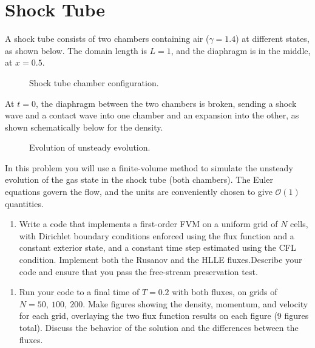 \pagebreak
\section{Shock Tube}
A shock tube consists of two chambers containing air ($\gamma = 1.4$) at different states, as shown below. The domain length is $L= 1$, and the diaphragm is in the middle, at $x= 0.5$.

\begin{figure}[h]
    \centering
    
    \caption{Shock tube chamber configuration.}
\end{figure}

At $t= 0$, the diaphragm between the two chambers is broken, sending a shock wave and a contact wave into one chamber and an expansion into the other, as shown schematically below for the density.

\begin{figure}[h]
    \centering
    
    \caption{Evolution of unsteady evolution.}
\end{figure}

In this problem you will use a finite-volume method to simulate the unsteady evolution of the gas state in the shock tube (both chambers). The Euler equations govern the flow, and the units are conveniently chosen to give $\mathcal{O}(1)$ quantities.

\begin{enumerate}[label=\alph*., start = 1]
    \item Write a code that implements a first-order FVM on a uniform grid of $N$ cells, with Dirichlet boundary conditions enforced using the flux function and a constant exterior state, and a constant time step estimated using the CFL condition. Implement both the Rusanov and the HLLE fluxes.Describe your code and ensure that you pass the free-stream preservation test.
\end{enumerate}

\begin{enumerate}[label=\alph*., start = 2]
    \item Run your code to a final time of $T= 0.2$ with both fluxes, on grids of $N= 50,\ 100,\ 200$.  Make figures  showing the density, momentum, and velocity for each grid, overlaying the two flux function results on each figure (9 figures total). Discuss the behavior of the solution and the differences between the fluxes.
\end{enumerate}